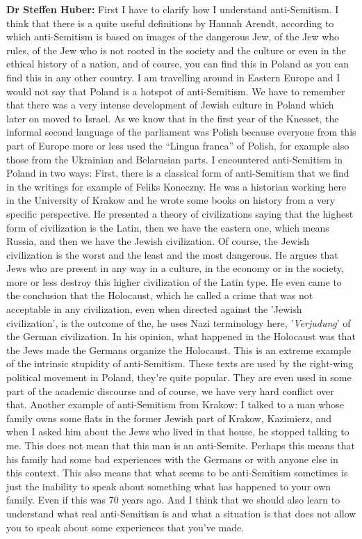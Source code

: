 \textbf{Dr Steffen Huber:} First I have to clarify how I understand anti-Semitism. I think that there is a quite useful definitions by Hannah Arendt, according to which anti-Semitism is based on images of the dangerous Jew, of the Jew who rules, of the Jew who is not rooted in the society and the culture or even in the ethical history of a nation, and of course, you can find this in Poland as you can find this in any other country. I am travelling around in Eastern Europe and I would not say that Poland is a hotspot of anti-Semitism. We have to remember that there was a very intense development of Jewish culture in Poland which later on moved to Israel. As we know that in the first year of the Knesset, the informal second language of the parliament was Polish because everyone from this part of Europe more or less used the “Lingua franca” of Polish, for example also those from the Ukrainian and Belarusian parts. I encountered anti-Semitism in Poland in two ways: First, there is a classical form of anti-Semitism that we find in the writings for example of Feliks Koneczny. He was a historian working here in the University of Krakow and he wrote some books on history from a very specific perspective. He presented a theory of civilizations saying that the highest form of civilization is the Latin, then we have the eastern one, which means Russia, and then we have the Jewish civilization. Of course, the Jewish civilization is the worst and the least and the most dangerous. He argues that Jews who are present in any way in a culture, in the economy or in the society, more or less destroy this higher civilization of the Latin type. He even came to the conclusion that the Holocaust, which he called a crime that was not acceptable in any civilization, even when directed against the 'Jewish civilization', is the outcome of the, he uses Nazi terminology here, '\textit{Verjudung}' of the German civilization. In his opinion, what happened in the Holocaust was that the Jews made the Germans organize the Holocaust. This is an extreme example of the intrinsic stupidity of anti-Semitism. These texts are used by the right-wing political movement in Poland, they're quite popular. They are even used in some part of the academic discourse and of course, we have very hard conflict over that.  Another example of anti-Semitism from Krakow: I talked to a man whose family owns some flats in the former Jewish part of Krakow, Kazimierz, and when I asked him about the Jews who lived in that house, he stopped talking to me. This does not mean that this man is an anti-Semite. Perhaps this means that his family had some bad experiences with the Germans or with anyone else in this context. This also means that what seems to be anti-Semitism sometimes is just the inability to speak about something what has happened to your own family. Even if this was 70 years ago. And I think that we should also learn to understand what real anti-Semitism is and what a situation is that does not allow you to speak about some experiences that you’ve made. 

